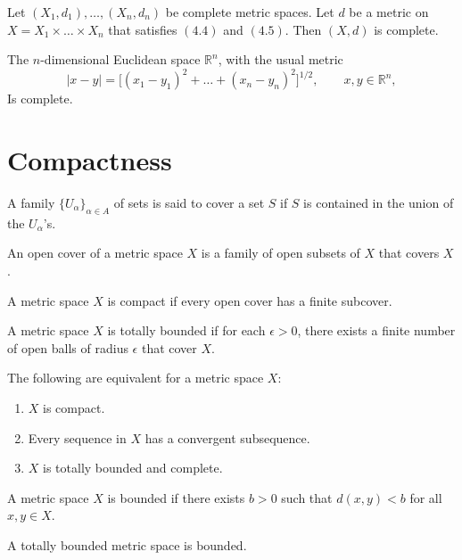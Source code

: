 \documentclass[nobib,notoc]{tufte-handout}
\begin{document}
\begin{thm}
	Let \((X_1,d_1),\ldots,(X_n,d_n)\) be complete metric spaces. Let \(d\) be a metric on \(X=X_1\times\ldots\times X_n\) that satisfies \((4.4)\) and \((4.5)\). Then \((X,d)\) is complete.
\end{thm}
\begin{cor}
	The \(n\)-dimensional Euclidean space \(\mathbb{R}^n\), with the usual metric
	\begin{equation*}
		\lvert x-y\rvert=\big[(x_1-y_1)^2+\ldots+(x_n-y_n)^2\big]^{1/2},\qquad x,y\in\mathbb{R}^n,
	\end{equation*}
	Is complete.
\end{cor}
\section{Compactness}
\begin{defi}[Cover]
	A family \(\{U_{\alpha}\}_{\alpha\in A}\) of sets is said to cover a set \(S\) if \(S\) is contained in the union of the \(U_{\alpha}\)'s.
\end{defi}
\begin{defi}
	An open cover of a metric space \(X\) is a family of open subsets of \(X\) that covers \(X\).
\end{defi}
\begin{defi}[Compactness]
	A metric space \(X\) is compact if every open cover has a finite subcover.
\end{defi}
\begin{defi}
	A metric space \(X\) is totally bounded if for each \(\epsilon>0\), there exists a finite number of open balls of radius \(\epsilon\) that cover \(X\).
\end{defi}
\begin{thm}
	The following are equivalent for a metric space \(X\):
	\begin{enumerate}
		\item \(X\) is compact.
		\item Every sequence in \(X\) has a convergent subsequence.
		\item \(X\) is totally bounded and complete.
	\end{enumerate}
\end{thm}
\begin{defi}[Bounded]
	A metric space \(X\) is bounded if there exists \(b>0\) such that \(d(x,y)<b\) for all \(x,y\in X\).
\end{defi}
\begin{lem}
	A totally bounded metric space is bounded.
\end{lem}
\end{document}
